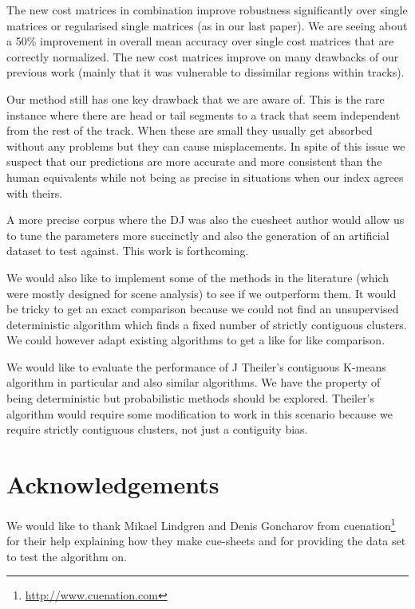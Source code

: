 \documentclass[twocolumn]{article}
\begin{document}
The new cost matrices in combination improve robustness significantly over single matrices or regularised single matrices (as in our last paper). We are seeing about a 50\% improvement in overall mean accuracy over single cost matrices that are correctly normalized. The new cost matrices improve on many drawbacks of our previous work (mainly that it was vulnerable to dissimilar regions within tracks). 

Our method still has one key drawback that we are aware of. This is the rare instance where there are head or tail segments to a track that seem independent from the rest of the track. When these are small they usually get absorbed without any problems but they can cause misplacements. In spite of this issue we suspect that our predictions are more accurate and more consistent than the human equivalents while not being as precise in situations when our index agrees with theirs.

A more precise corpus where the DJ was also the cuesheet author would allow us to tune the parameters more succinctly and also the generation of an artificial dataset to test against. This work is forthcoming. 

We would also like to implement some of the methods in the literature (which were mostly designed for scene analysis) to see if we outperform them. It would be tricky to get an exact comparison because we could not find an unsupervised deterministic algorithm which finds a fixed number of strictly contiguous clusters. We could however adapt existing algorithms to get a like for like comparison. 

We would like to evaluate the performance of J Theiler's contiguous K-means algorithm in particular \cite{theiler1997contiguity} and also similar algorithms. We have the property of being deterministic but probabilistic methods should be explored. Theiler's algorithm would require some modification to work in this scenario because we require strictly contiguous clusters, not just a contiguity bias. 

\section{Acknowledgements}\label{sec:acknowledgements}

We would like to thank Mikael Lindgren and Denis Goncharov from cuenation\footnote{\url{http://www.cuenation.com}} for their help explaining how they make cue-sheets and for providing the data set to test the algorithm on.



\end{document}
